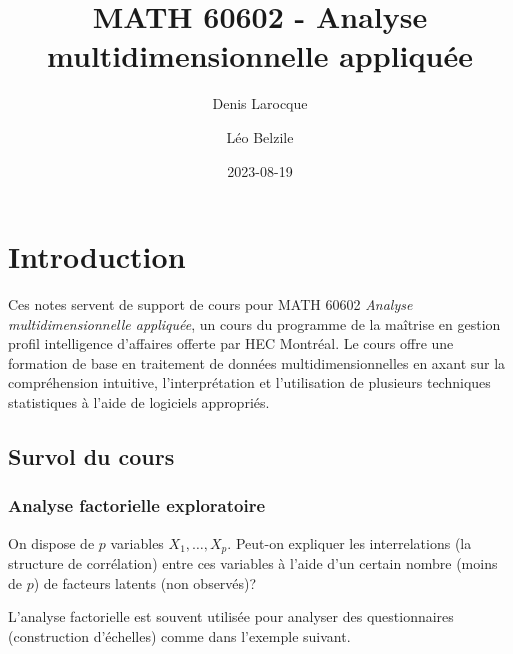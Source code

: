 \documentclass[
  11pt,
  letterpaper,
]{scrbook}
\title{MATH 60602 - Analyse multidimensionnelle appliquée}
\author{Denis Larocque \and Léo Belzile}
\date{2023-08-19}
\renewcommand*\contentsname{Table des matières}
\newcommand\contentsname{Table des matières}
\theoremstyle{definition}
\theoremstyle{remark}
\begin{document}


\ifdefined\Shaded\renewenvironment{Shaded}{\begin{tcolorbox}[boxrule=0pt, sharp corners, enhanced, borderline west={3pt}{0pt}{shadecolor}, interior hidden, breakable, frame hidden]}{\end{tcolorbox}}\fi

\renewcommand*\contentsname{Table des matières}
{
\setcounter{tocdepth}{2}
\tableofcontents
}
\mainmatter
{}

\hypertarget{introduction}{%
\chapter{Introduction}\label{introduction}}

Ces notes servent de support de cours pour MATH 60602 \emph{Analyse
multidimensionnelle appliquée}, un cours du programme de la maîtrise en
gestion profil intelligence d'affaires offerte par HEC Montréal. Le
cours offre une formation de base en traitement de données
multidimensionnelles en axant sur la compréhension intuitive,
l'interprétation et l'utilisation de plusieurs techniques statistiques à
l'aide de logiciels appropriés.

\hypertarget{survol-du-cours}{%
\section{Survol du cours}\label{survol-du-cours}}

\hypertarget{analyse-factorielle-exploratoire}{%
\subsection{Analyse factorielle
exploratoire}\label{analyse-factorielle-exploratoire}}

On dispose de \(p\) variables \(X_1, \ldots, X_p\). Peut-on expliquer
les interrelations (la structure de corrélation) entre ces variables à
l'aide d'un certain nombre (moins de \(p\)) de facteurs latents (non
observés)?

L'analyse factorielle est souvent utilisée pour analyser des
questionnaires (construction d'échelles) comme dans l'exemple suivant.
\end{document}
